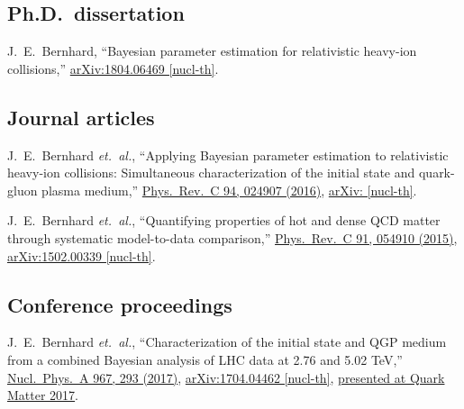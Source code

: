 \documentclass[letterpaper,10pt]{article}
\begin{document}
\begin{multicols}{2}
\subsection{Ph.D.\ dissertation}

J.~E.~Bernhard,
``Bayesian parameter estimation for relativistic heavy-ion collisions,''
\href{https://arxiv.org/abs/1804.06469}{arXiv:1804.06469 [nucl-th]}.

\subsection{Journal articles}

J.~E.~Bernhard \textit{et.\ al.},
``Applying Bayesian parameter estimation to relativistic heavy-ion collisions: Simultaneous characterization of the initial state and quark-gluon plasma medium,''
\href{https://journals.aps.org/prc/abstract/10.1103/PhysRevC.94.024907}{Phys.\ Rev.\ C 94, 024907 (2016)},
\href{https://arxiv.org/abs/1605.03954}{arXiv: [nucl-th]}.

J.~E.~Bernhard \textit{et.\ al.},
``Quantifying properties of hot and dense QCD matter through systematic model-to-data comparison,''
\href{https://journals.aps.org/prc/abstract/10.1103/PhysRevC.91.054910}{Phys.\ Rev.\ C 91, 054910 (2015)},
\href{https://arxiv.org/abs/1502.00339}{arXiv:1502.00339 [nucl-th]}.


\subsection{Conference proceedings}

J.~E.~Bernhard \textit{et.\ al.},
``Characterization of the initial state and QGP medium from a combined Bayesian analysis of LHC data at 2.76 and 5.02 TeV,''
\href{https://www.sciencedirect.com/science/article/pii/S0375947417301549}{Nucl.\ Phys.\ A 967, 293 (2017)},
\href{https://arxiv.org/abs/1704.04462}{arXiv:1704.04462 [nucl-th]},
\href{https://indico.cern.ch/event/433345/contributions/2358284}{presented at Quark Matter 2017}.

\end{multicols}
\end{document}
